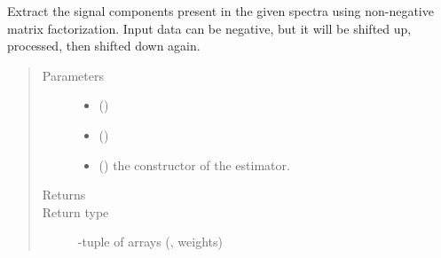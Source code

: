 \documentclass[letterpaper,10pt,english]{sphinxmanual}
\begin{document}
\begin{fulllineitems}
\label{\detokenize{xanespy:xanespy.xanes_math.extract_signals_nmf}}
Extract the signal components present in the given spectra using
non-negative matrix factorization. Input data can be negative, but
it will be shifted up, processed, then shifted down again.
\begin{quote}\begin{description}
\item[{Parameters}] \leavevmode\begin{itemize}
\item {} 
 (\sphinxstyleliteralemphasis{-}) \textendash{} 

\item {} 
 (\sphinxstyleliteralemphasis{-}) \textendash{} 

\item {} 
 (\sphinxstyleliteralemphasis{-}) \textendash{} the constructor of the estimator.

\end{itemize}

\item[{Returns}] \leavevmode


\item[{Return type}] -tuple of arrays ({\hyperref[\detokenize{xanespy:xanespy.xanes_frameset.XanesFrameset.components}]{}}, weights)

\end{description}\end{quote}

\end{fulllineitems}

\end{document}
